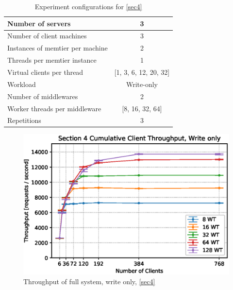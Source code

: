 \documentclass[11pt,a4paper]{article}
\begin{document}
\begin{table}
    \centering
	\begin{tabular}{|l|c|}
		\hline Number of servers                & 3                         \\ 
		\hline Number of client machines        & 3                         \\ 
		\hline Instances of memtier per machine & 2                         \\ 
		\hline Threads per memtier instance     & 1                         \\
		\hline Virtual clients per thread       & [1, 3, 6, 12, 20, 32]     \\ 
		\hline Workload                         & Write-only                \\
		\hline Number of middlewares            & 2                         \\
		\hline Worker threads per middleware    & [8, 16, 32, 64]           \\
		\hline Repetitions                      & 3                         \\ 
		\hline 
	\end{tabular}
	\caption{Experiment configurations for \autoref{sec4}} \label{exp4}
\end{table}

\begin{figure}
    \centering
    \includegraphics[width=0.7\linewidth]{plots/4b_throughputMiddleware.eps}
    \caption{Throughput of full system, write only, \autoref{sec4}}
    \label{fig:4-throughput}
\end{figure}
\end{document}
